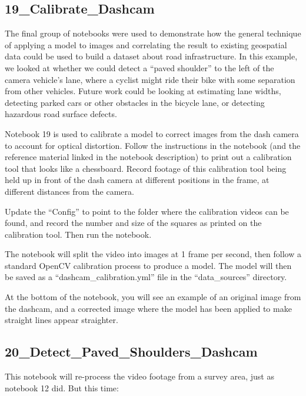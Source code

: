 \documentclass[11pt,twoside]{report}
\begin{document}
\subsection{19\_Calibrate\_Dashcam}
\label{a19}

The final group of notebooks were used to demonstrate how the general technique of applying a model to images and correlating the result to existing geospatial data could be used to build a dataset about road infrastructure.  In this example, we looked at whether we could detect a ``paved shoulder'' to the left of the camera vehicle's lane, where a cyclist might ride their bike with some separation from other vehicles.  Future work could be looking at estimating lane widths, detecting parked cars or other obstacles in the bicycle lane, or detecting hazardous road surface defects.

Notebook 19 is used to calibrate a model to correct images from the dash camera to account for optical distortion.  Follow the instructions in the notebook (and the reference material linked in the notebook description) to print out a calibration tool that looks like a chessboard.  Record footage of this calibration tool being held up in front of the dash camera at different positions in the frame, at different distances from the camera.

Update the ``Config'' to point to the folder where the calibration videos can be found, and record the number and size of the squares as printed on the calibration tool.  Then run the notebook.

The notebook will split the video into images at 1 frame per second, then follow a standard OpenCV calibration process to produce a model.  The model will then be saved as a ``dashcam\_calibration.yml'' file in the ``data\_sources'' directory.

At the bottom of the notebook, you will see an example of an original image from the dashcam, and a corrected image where the model has been applied to make straight lines appear straighter.


\subsection{20\_Detect\_Paved\_Shoulders\_Dashcam}
\label{a20}

This notebook will re-process the video footage from a survey area, just as notebook 12 did.  But this time:
\end{document}
